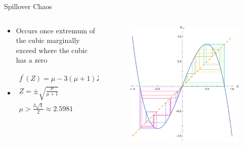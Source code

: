 \documentclass{beamer}
\begin{document}
\begin{frame}{Spillover Chaos}
	\begin{columns}
		\begin{column}{0.5\textwidth}
			\begin{itemize}
				\item
					\centering
					Occurs once extremum of the cubic marginally exceed where the cubic has a zero

				\item
					\begin{gather*}
						f^\prime(Z)=\mu-3(\mu+1)Z^2=0\\
						Z=\pm\sqrt{\frac{\mu}{\mu+1}}\\
						\mu>\frac{3\sqrt{3}}{2}\approx2.5981
					\end{gather*}
			\end{itemize}
		\end{column}

		\begin{column}{0.5\textwidth}
			\begin{figure}
				\centering
				\includegraphics[width=\textwidth]{spillover_chaos.pdf}
			\end{figure}
		\end{column}
	\end{columns}
\end{frame}
\end{document}
